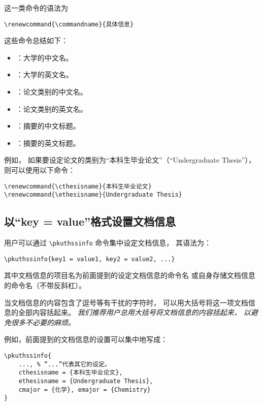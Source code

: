 		这一类命令的语法为
\begin{Verbatim}[frame = single]
% commandname 为具体的命令名。
\renewcommand{\commandname}{具体信息}
\end{Verbatim}

		这些命令总结如下：
		\begin{itemize}
			\item \texttt{\bfseries\string\cuniversity}：大学的中文名。
			\item \texttt{\bfseries\string\euniversity}：大学的英文名。
			\item \texttt{\bfseries\string\cthesisname}：论文类别的中文名。
			\item \texttt{\bfseries\string\ethesisname}：论文类别的英文名。
			\item \texttt{\bfseries\string\cabstractname}：摘要的中文标题。
			\item \texttt{\bfseries\string\eabstractname}：摘要的英文标题。
		\end{itemize}

		例如，
		如果要设定论文的类别为“本科生毕业论文”（“Undergraduate Thesis”），
		则可以使用以下命令：
\begin{Verbatim}[frame = single]
\renewcommand{\cthesisname}{本科生毕业论文}
\renewcommand{\ethesisname}{Undergraduate Thesis}
\end{Verbatim}

		\subsection{以“key = value”格式设置文档信息}

		用户可以通过 \verb|\pkuthssinfo| 命令集中设定文档信息，
		其语法为：
\begin{Verbatim}[frame = single]
% key1、key2、value1、value2 等为具体文档信息的项目名和内容。
\pkuthssinfo{key1 = value1, key2 = value2, ...}
\end{Verbatim}
		其中文档信息的项目名为前面提到的设定文档信息的命令名%
		或自身存储文档信息的命令名（不带反斜杠）。

		当文档信息的内容包含了逗号等有干扰的字符时，
		可以用大括号将这一项文档信息的全部内容括起来。%
		\emph{%
			我们推荐用户总用大括号将文档信息的内容括起来，
			以避免很多不必要的麻烦。%
		}

		例如，前面提到的文档信息的设置可以集中地写成：
\begin{Verbatim}[frame = single, tabsize = 4]
\pkuthssinfo{
	..., % “...”代表其它的设定。
	cthesisname = {本科生毕业论文},
	ethesisname = {Undergraduate Thesis},
	cmajor = {化学}, emajor = {Chemistry}
}
\end{Verbatim}

